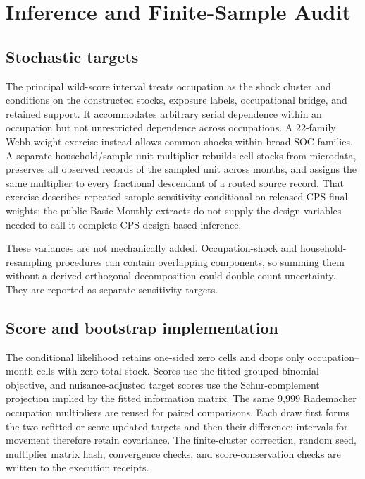 \section{Inference and Finite-Sample Audit}\label{app:inference}

\subsection{Stochastic targets}

The principal wild-score interval treats occupation as the shock cluster and conditions on the constructed stocks, exposure labels, occupational bridge, and retained support.  It accommodates arbitrary serial dependence within an occupation but not unrestricted dependence across occupations.  A 22-family Webb-weight exercise instead allows common shocks within broad SOC families.  A separate household/sample-unit multiplier rebuilds cell stocks from microdata, preserves all observed records of the sampled unit across months, and assigns the same multiplier to every fractional descendant of a routed source record.  That exercise describes repeated-sample sensitivity conditional on released CPS final weights; the public Basic Monthly extracts do not supply the design variables needed to call it complete CPS design-based inference.

These variances are not mechanically added.  Occupation-shock and household-resampling procedures can contain overlapping components, so summing them without a derived orthogonal decomposition could double count uncertainty.  They are reported as separate sensitivity targets.

\subsection{Score and bootstrap implementation}

The conditional likelihood retains one-sided zero cells and drops only occupation--month cells with zero total stock.  Scores use the fitted grouped-binomial objective, and nuisance-adjusted target scores use the Schur-complement projection implied by the fitted information matrix.  The same 9,999 Rademacher occupation multipliers are reused for paired comparisons.  Each draw first forms the two refitted or score-updated targets and then their difference; intervals for movement therefore retain covariance.  The finite-cluster correction, random seed, multiplier matrix hash, convergence checks, and score-conservation checks are written to the execution receipts.

